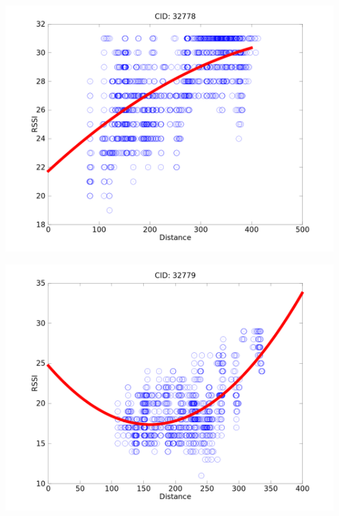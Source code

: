 \documentclass{beamer}
\begin{document}
{\begin{columns}[T]
\begin{column}{0.32\textwidth}
			\includegraphics[width=0.95\textwidth]{cell32778inter-contrast.png}
	
			\includegraphics[width=0.95\textwidth]{cell32779inter-contrast.png}
		\end{column}
	\end{columns}

}
\end{document}
